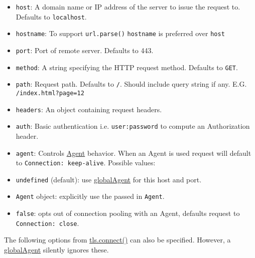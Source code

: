 \begin{itemize}
\itemsep1pt\parskip0pt
\item
  \texttt{host}: A domain name or IP address of the server to issue the
  request to. Defaults to
  \texttt{\textquotesingle{}localhost\textquotesingle{}}.
\item
  \texttt{hostname}: To support \texttt{url.parse()} \texttt{hostname}
  is preferred over \texttt{host}
\item
  \texttt{port}: Port of remote server. Defaults to 443.
\item
  \texttt{method}: A string specifying the HTTP request method. Defaults
  to \texttt{\textquotesingle{}GET\textquotesingle{}}.
\item
  \texttt{path}: Request path. Defaults to
  \texttt{\textquotesingle{}/\textquotesingle{}}. Should include query
  string if any. E.G.
  \texttt{\textquotesingle{}/index.html?page=12\textquotesingle{}}
\item
  \texttt{headers}: An object containing request headers.
\item
  \texttt{auth}: Basic authentication i.e.
  \texttt{\textquotesingle{}user:password\textquotesingle{}} to compute
  an Authorization header.
\item
  \texttt{agent}: Controls
  \hyperref[httpsux5fclassux5fhttpsux5fagent]{Agent} behavior. When an
  Agent is used request will default to
  \texttt{Connection:\ keep-alive}. Possible values:
\item
  \texttt{undefined} (default): use
  \hyperref[httpsux5fhttpsux5fglobalagent]{globalAgent} for this host
  and port.
\item
  \texttt{Agent} object: explicitly use the passed in \texttt{Agent}.
\item
  \texttt{false}: opts out of connection pooling with an Agent, defaults
  request to \texttt{Connection:\ close}.
\end{itemize}

The following options from
\href{tls.html\#tls_tls_connect_options_callback}{tls.connect()} can
also be specified. However, a
\hyperref[httpsux5fhttpsux5fglobalagent]{globalAgent} silently ignores
these.

